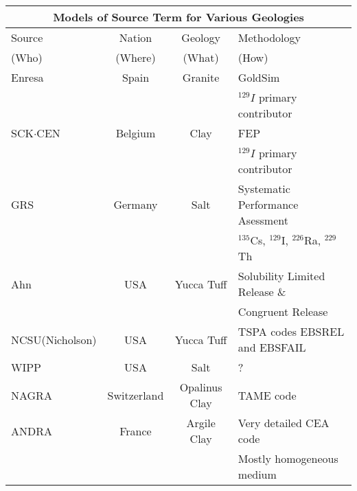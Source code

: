   \begin{table}
    \centering
    \footnotesize{
    \begin{tabular}{|l|c|c|l|}
      \multicolumn{4}{c}{\textbf{Models of Source Term for Various Geologies}}\\
      \hline
      Source & Nation & Geology & Methodology \\  
      (Who) & (Where) & (What) & (How) \\  
      \hline
      Enresa \cite{von_lensa_red-impact_2008}           & Spain       & Granite                   &  GoldSim \\ 
                                                        &             &                           & $^{129}I$ primary contributor \\
      SCK$\cdot$CEN   \cite{von_lensa_red-impact_2008}  & Belgium     & Clay                      & FEP\\
                                                        &             &                           & $^{129}I$ primary contributor \\
      GRS \cite{von_lensa_red-impact_2008}              & Germany     & Salt                      & Systematic Performance Asessment \\
                                                        &             &                           & $^{135}$Cs, $^{129}$I, $^{226}$Ra, $^{229}$Th \\
      Ahn \cite{ahn_environmental_2004, ahn_environmental_2007} & USA     & Yucca Tuff                & Solubility Limited Release \& \\ 
                                                        &             &                           & Congruent Release  \\
      NCSU(Nicholson) \cite{li_methodology_2006}        & USA         & Yucca Tuff                & TSPA codes EBSREL and EBSFAIL  \\ 
      WIPP                                              & USA         & Salt                      & ?  \\
      NAGRA \cite{johnson_project_2002, johnson_calculations_2002}  & Switzerland & Opalinus Clay & TAME code  \\
      ANDRA \cite{andra_argile:_2005}                   & France      & Argile Clay               & Very detailed CEA code  \\
                                                        &             &                           & Mostly homogeneous medium \\

\end{tabular}}
\end{table}
